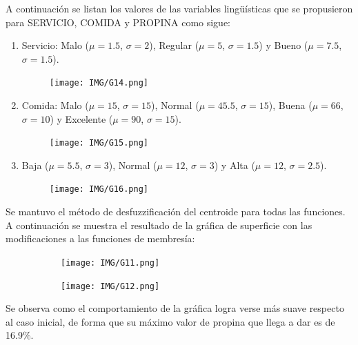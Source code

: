 \documentclass[11pt, letterpaper]{article}
\begin{document}
	A continuación se listan los valores de las variables lingüísticas que se propusieron para SERVICIO, COMIDA y PROPINA como sigue:
	
	
	\begin{enumerate}
		\item Servicio: Malo ($\mu = 1.5$, $\sigma = 2$), Regular ($\mu = 5$, $\sigma = 1.5$) y Bueno ($\mu = 7.5$, $\sigma = 1.5$).
		\begin{figure}[h]
			\centering
			\texttt{[image: IMG/G14.png]}
		\end{figure}
		
		\item Comida: Malo ($\mu = 15$, $\sigma = 15$), Normal ($\mu = 45.5$, $\sigma = 15$), Buena ($\mu = 66$, $\sigma = 10$) y Excelente ($\mu = 90$, $\sigma = 15$).
		\begin{figure}[h]
			\centering
			\texttt{[image: IMG/G15.png]}
		\end{figure}
		\newpage
		\item Baja ($\mu = 5.5$, $\sigma = 3$), Normal ($\mu = 12$, $\sigma = 3$) y Alta ($\mu = 12$, $\sigma = 2.5$).
		\begin{figure}[h]
			\centering
			\texttt{[image: IMG/G16.png]}
		\end{figure}
	\end{enumerate}
	
	Se mantuvo el método de desfuzzificación del centroide para todas las funciones.\\
	
	A continuación se muestra el resultado de la gráfica de superficie con las modificaciones a las funciones de membresía: \\
	
	
	\begin{figure}[h]
		\centering
		\begin{subfigure}{0.42\textwidth} %
			\centering
			\texttt{[image: IMG/G11.png]}
			\label{fig:G11}
		\end{subfigure}
		\hfill
		\begin{subfigure}{0.42\textwidth} %
			\centering
			\texttt{[image: IMG/G12.png]}
			\label{fig:G12}
		\end{subfigure}
		\label{fig:comparacion}
	\end{figure}
	
	Se observa como el comportamiento de la gráfica logra verse más suave respecto al caso inicial, de forma que su máximo valor de propina que llega a dar es de 16.9\%.
	
\end{document}
